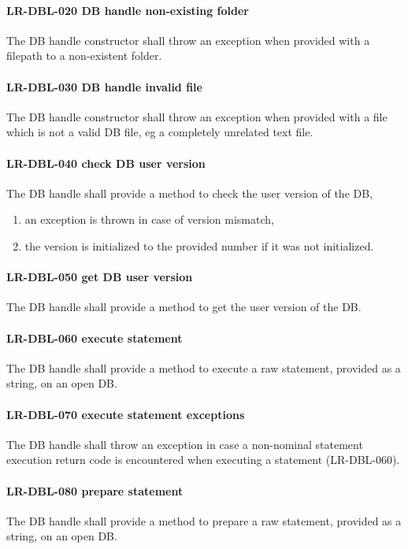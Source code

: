 \paragraph{LR-DBL-020 DB handle non-existing folder}
The DB handle constructor shall throw an exception when provided with a filepath
to a non-existent folder.

\paragraph{LR-DBL-030 DB handle invalid file}
The DB handle constructor shall throw an exception when provided with a
file which is not a valid DB file, eg a completely unrelated text file.

\paragraph{LR-DBL-040 check DB user version}
The DB handle shall provide a method to check the user version of the DB,
\begin{enumerate}
\item an exception is thrown in case of version mismatch,
\item the version is initialized to the provided number if it was not
      initialized.
\end{enumerate}

\paragraph{LR-DBL-050 get DB user version}
The DB handle shall provide a method to get the user version of the DB.

\paragraph{LR-DBL-060 execute statement}
The DB handle shall provide a method to execute a raw statement, provided
as a string, on an open DB.

\paragraph{LR-DBL-070 execute statement exceptions}
The DB handle shall throw an exception in case a non-nominal statement
execution return code is encountered when executing a statement (LR-DBL-060).

\paragraph{LR-DBL-080 prepare statement}
The DB handle shall provide a method to prepare a raw statement, provided
as a string, on an open DB.

